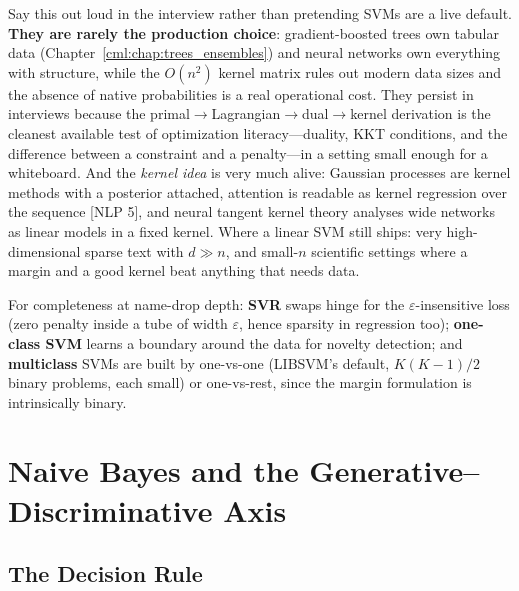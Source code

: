 \begin{keyinsight}
Say this out loud in the interview rather than pretending SVMs are a live default. \textbf{They are rarely the production choice}: gradient-boosted trees own tabular data (Chapter~\ref{cml:chap:trees_ensembles}) and neural networks own everything with structure, while the $O(n^2)$ kernel matrix rules out modern data sizes and the absence of native probabilities is a real operational cost. They persist in interviews because the primal$\to$Lagrangian$\to$dual$\to$kernel derivation is the cleanest available test of optimization literacy---duality, KKT conditions, and the difference between a constraint and a penalty---in a setting small enough for a whiteboard. And the \emph{kernel idea} is very much alive: Gaussian processes are kernel methods with a posterior attached, attention is readable as kernel regression over the sequence [NLP 5], and neural tangent kernel theory analyses wide networks as linear models in a fixed kernel. Where a linear SVM still ships: very high-dimensional sparse text with $d \gg n$, and small-$n$ scientific settings where a margin and a good kernel beat anything that needs data.
\end{keyinsight}

For completeness at name-drop depth: \textbf{SVR} swaps hinge for the $\varepsilon$-insensitive loss (zero penalty inside a tube of width $\varepsilon$, hence sparsity in regression too); \textbf{one-class SVM} learns a boundary around the data for novelty detection; and \textbf{multiclass} SVMs are built by one-vs-one (LIBSVM's default, $K(K-1)/2$ binary problems, each small) or one-vs-rest, since the margin formulation is intrinsically binary.

\section{Naive Bayes and the Generative--Discriminative Axis}
\label{cml:sec:naive_bayes}

\subsection{The Decision Rule}

